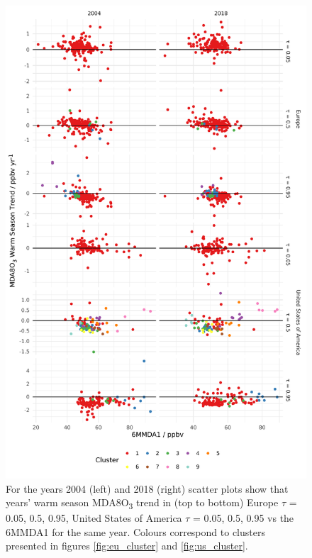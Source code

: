 \documentclass[journal abbreviation, manuscript]{copernicus}
\begin{document}
\begin{figure}[p]
\centering
\includegraphics[height=0.9\textheight]{figures/paper_figures/f10_mda8_warm_cluster_mda8_6mmda1.pdf}
\caption{For the years 2004 (left) and 2018 (right) scatter plots show that years' warm season MDA8O\textsubscript{3} trend in (top to bottom) Europe $\tau$ = 0.05, 0.5, 0.95, United States of America $\tau$ = 0.05, 0.5, 0.95 vs the 6MMDA1 for the same year. Colours correspond to clusters presented in figures \ref{fig:eu_cluster} and \ref{fig:us_cluster}.}
\label{fig:mda8_warm_cluster_mda8_6mmda1}
\end{figure}
\clearpage
\end{document}
